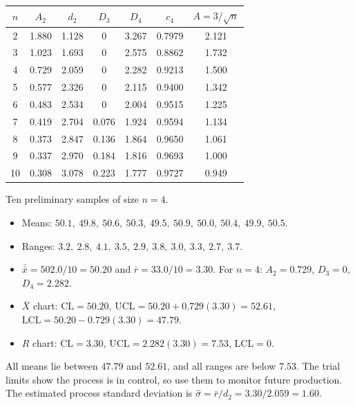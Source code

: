 \begin{center}
\small
\begin{tabular}{c|ccccc|c}
\toprule
$n$ & $A_2$ & $d_2$ & $D_3$ & $D_4$ & $c_4$ & $A=3/\sqrt n$\\
\midrule
2 & 1.880 & 1.128 & 0 & 3.267 & 0.7979 & 2.121\\
3 & 1.023 & 1.693 & 0 & 2.575 & 0.8862 & 1.732\\
4 & 0.729 & 2.059 & 0 & 2.282 & 0.9213 & 1.500\\
5 & 0.577 & 2.326 & 0 & 2.115 & 0.9400 & 1.342\\
6 & 0.483 & 2.534 & 0 & 2.004 & 0.9515 & 1.225\\
7 & 0.419 & 2.704 & 0.076 & 1.924 & 0.9594 & 1.134\\
8 & 0.373 & 2.847 & 0.136 & 1.864 & 0.9650 & 1.061\\
9 & 0.337 & 2.970 & 0.184 & 1.816 & 0.9693 & 1.000\\
10 & 0.308 & 3.078 & 0.223 & 1.777 & 0.9727 & 0.949\\
\bottomrule
\end{tabular}
\end{center}

\begin{example}\label{ex:xbarR}
Ten preliminary samples of size $n=4$.
\begin{itemize}
  \item Means: $50.1,\ 49.8,\ 50.6,\ 50.3,\ 49.5,\ 50.9,\ 50.0,\ 50.4,\ 49.9,\ 50.5$.
  \item Ranges: $3.2,\ 2.8,\ 4.1,\ 3.5,\ 2.9,\ 3.8,\ 3.0,\ 3.3,\ 2.7,\ 3.7$.
  \item $\bar{\bar{x}}=502.0/10=50.20$ and $\bar{r}=33.0/10=3.30$. For $n=4$: $A_2=0.729$, $D_3=0$, $D_4=2.282$.
  \item $\bar{X}$ chart: $\mathrm{CL}=50.20$, $\mathrm{UCL}=50.20+0.729(3.30)=52.61$, $\mathrm{LCL}=50.20-0.729(3.30)=47.79$.
  \item $R$ chart: $\mathrm{CL}=3.30$, $\mathrm{UCL}=2.282(3.30)=7.53$, $\mathrm{LCL}=0$.
\end{itemize}
All means lie between $47.79$ and $52.61$, and all ranges are below $7.53$. The trial limits show the process is in control, so use them to monitor future production. The estimated process standard deviation is $\hat\sigma=\bar{r}/d_2=3.30/2.059=1.60$.
\end{example}

